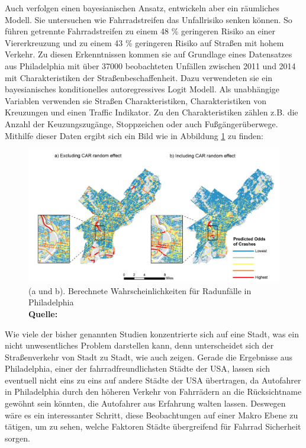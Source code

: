 \documentclass[a4paper,12pt]{thesis}
\newcommand*{\captionsource}[2]{%
	\caption[{#1}]{%
		#1%
		\\\hspace{\linewidth}%
		\textbf{Quelle:} #2%
	}%
}
\begin{document}
Auch \cite{Kondo2018} verfolgen einen bayesianischen Ansatz, entwickeln aber ein räumliches Modell. Sie untersuchen wie Fahrradstreifen das Unfallrisiko senken können. So führen getrennte Fahrradstreifen zu einem 48 \% geringeren Risiko an einer Viererkreuzung und zu einem 43 \% geringeren Risiko auf Straßen mit hohem Verkehr. Zu diesen Erkenntnissen kommen sie auf Grundlage eines Datensatzes aus Philadelphia mit über 37000 beobachteten Unfällen zwischen 2011 und 2014 mit Charakteristiken der Straßenbeschaffenheit. Dazu verwendeten sie ein bayesianisches konditionelles autoregressives Logit Modell. Als unabhängige Variablen verwenden sie Straßen Charakteristiken, Charakteristiken von Kreuzungen und einen Traffic Indikator. Zu den Charakteristiken zählen z.B. die Anzahl der Keuzungszugänge, Stoppzeichen oder auch Fußgängerüberwege. Mithilfe dieser Daten ergibt sich ein Bild wie in Abbildung \ref{kondor} zu finden:
\begin{figure}[!ht]
	\centering
	\includegraphics[width=\textwidth]{Plots/Kondor.png}
	\captionsource{(a und b). Berechnete Wahrscheinlichkeiten für Radunfälle in Philadelphia}{
		\cite{Kondo2018}
	}
	\label{kondor}
\end{figure}
Wie viele der bisher genannten Studien konzentrierte sich \cite{Kondo2018} auf eine Stadt, was ein nicht unwesentliches Problem darstellen kann, denn unterscheidet sich der Straßenverkehr von Stadt zu Stadt, wie auch \cite{Goldmann2021} zeigen. Gerade die Ergebnisse aus Philadelphia, einer der fahrradfreundlichsten Städte der USA, lassen sich eventuell nicht eins zu eins auf andere Städte der USA übertragen, da Autofahrer in Philadelphia durch den höheren Verkehr von Fahrrädern an die Rücksichtname gewöhnt sein könnten, die Autofahrer aus Erfahrung walten lassen. Deswegen wäre es ein interessanter Schritt, diese Beobachtungen auf einer Makro Ebene zu tätigen, um zu sehen, welche Faktoren Städte übergreifend für Fahrrad Sicherheit sorgen.\\
\end{document}
